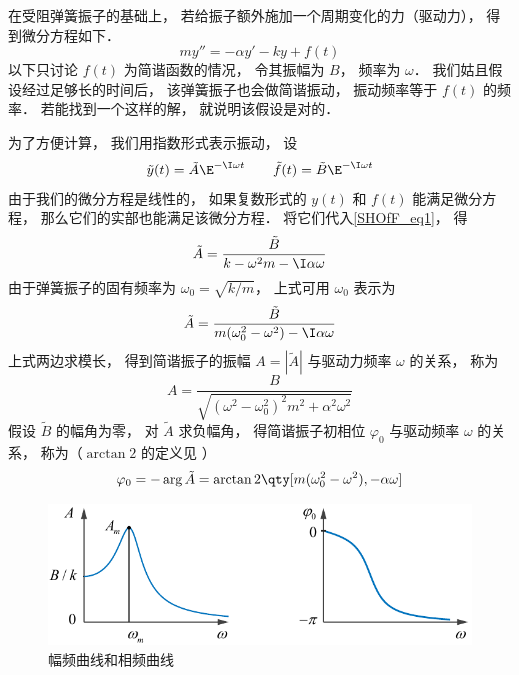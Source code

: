 

在受阻弹簧振子的基础上， 若给振子额外施加一个周期变化的力（驱动力）， 得到微分方程如下．
\begin{equation}\label{SHOfF_eq1}
my'' = -\alpha y' - ky + f(t)
\end{equation}
以下只讨论 $f(t)$ 为简谐函数的情况， 令其振幅为 $B$， 频率为 $\omega$． 我们姑且假设经过足够长的时间后， 该弹簧振子也会做简谐振动， 振动频率等于 $f(t)$ 的频率． 若能找到一个这样的解， 就说明该假设是对的．

为了方便计算， 我们用指数形式表示振动， 设
\begin{equation}
\tilde y(t) = \tilde A\E^{-\I\omega t} \qquad
\tilde f(t) = \tilde B\E^{-\I \omega t}
\end{equation}
由于我们的微分方程是线性的， 如果复数形式的 $y(t)$ 和 $f(t)$ 能满足微分方程， 那么它们的实部也能满足该微分方程． 将它们代入\autoref{SHOfF_eq1}， 得
\begin{equation}
\tilde A =  \frac{\tilde B}{k -\omega^2 m - \I\alpha\omega}
\end{equation}
由于弹簧振子的固有频率为 $\omega_0 = \sqrt{k/m}$， 上式可用 $\omega_0$ 表示为
\begin{equation}
\tilde A = \frac{\tilde B}{m(\omega_0^2 - \omega^2) - \I\alpha\omega}
\end{equation}
上式两边求模长， 得到简谐振子的振幅 $A = |\tilde A|$ 与驱动力频率 $\omega$ 的关系， 称为
\begin{equation}\label{SHOfF_eq5}
A = \frac{B}{\sqrt{(\omega^2 - \omega_0^2)^2 m^2 + \alpha^2\omega^2}}
\end{equation}
假设 $\tilde B$ 的幅角为零， 对 $\tilde A$ 求负幅角， 得简谐振子初相位 $\varphi_0$ 与驱动频率 $\omega$ 的关系， 称为（$\arctan2$ 的定义见%
）
\begin{equation}\label{SHOfF_eq6}
\varphi_0 = -\arg \tilde A = \arctan2 \qty[m(\omega_0^2 - \omega^2), -\alpha\omega]
\end{equation}

\begin{figure}[ht]
\centering
\includegraphics[width=12cm]{./figures/SHOfF.pdf}
\caption{幅频曲线和相频曲线} \label{SHOfF_fig1}
\end{figure}


